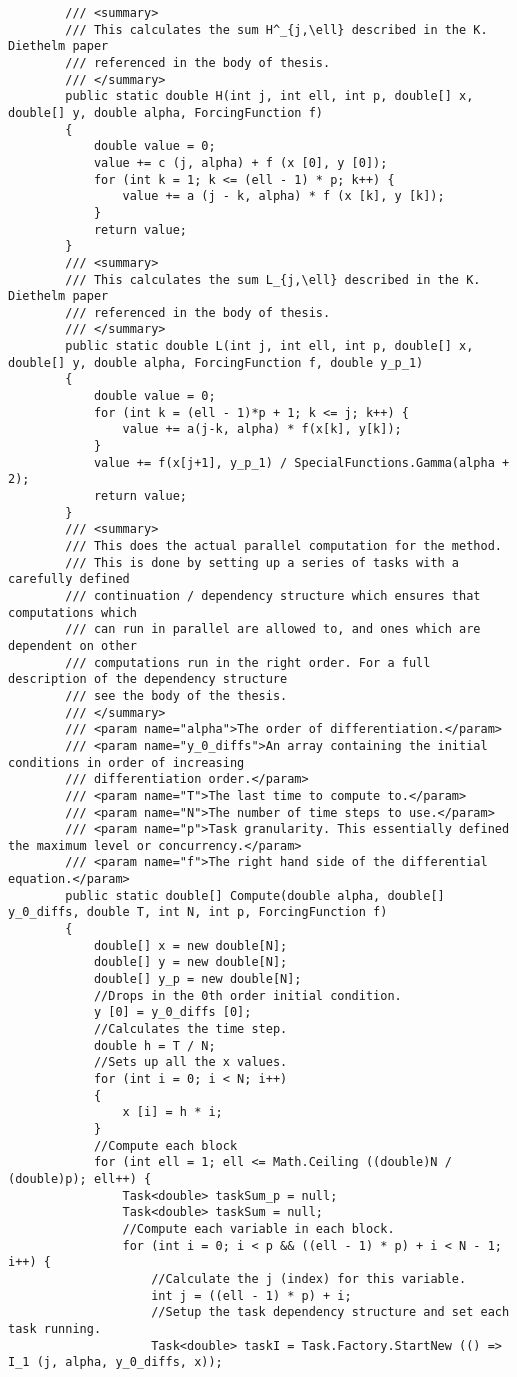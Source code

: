 \begin{lstlisting}
		/// <summary>
		/// This calculates the sum H^_{j,\ell} described in the K. Diethelm paper
		/// referenced in the body of thesis.
		/// </summary>
		public static double H(int j, int ell, int p, double[] x, double[] y, double alpha, ForcingFunction f)
		{
			double value = 0;
			value += c (j, alpha) + f (x [0], y [0]);
			for (int k = 1; k <= (ell - 1) * p; k++) {
				value += a (j - k, alpha) * f (x [k], y [k]);
			}
			return value;
		}
		/// <summary>
		/// This calculates the sum L_{j,\ell} described in the K. Diethelm paper
		/// referenced in the body of thesis.
		/// </summary>
		public static double L(int j, int ell, int p, double[] x, double[] y, double alpha, ForcingFunction f, double y_p_1)
		{
			double value = 0;
			for (int k = (ell - 1)*p + 1; k <= j; k++) {
				value += a(j-k, alpha) * f(x[k], y[k]);
			}
			value += f(x[j+1], y_p_1) / SpecialFunctions.Gamma(alpha + 2);
			return value;
		}
		/// <summary>
		/// This does the actual parallel computation for the method.
		/// This is done by setting up a series of tasks with a carefully defined
		/// continuation / dependency structure which ensures that computations which
		/// can run in parallel are allowed to, and ones which are dependent on other
		/// computations run in the right order. For a full description of the dependency structure
		/// see the body of the thesis.
		/// </summary>
		/// <param name="alpha">The order of differentiation.</param>
		/// <param name="y_0_diffs">An array containing the initial conditions in order of increasing
		/// differentiation order.</param>
		/// <param name="T">The last time to compute to.</param>
		/// <param name="N">The number of time steps to use.</param>
		/// <param name="p">Task granularity. This essentially defined the maximum level or concurrency.</param>
		/// <param name="f">The right hand side of the differential equation.</param>
		public static double[] Compute(double alpha, double[] y_0_diffs, double T, int N, int p, ForcingFunction f)
		{
			double[] x = new double[N];
			double[] y = new double[N];
			double[] y_p = new double[N];
			//Drops in the 0th order initial condition.
			y [0] = y_0_diffs [0];
			//Calculates the time step.
			double h = T / N;
			//Sets up all the x values.
			for (int i = 0; i < N; i++)
			{
				x [i] = h * i;
			}
			//Compute each block
			for (int ell = 1; ell <= Math.Ceiling ((double)N / (double)p); ell++) {
				Task<double> taskSum_p = null;
				Task<double> taskSum = null;
				//Compute each variable in each block.
				for (int i = 0; i < p && ((ell - 1) * p) + i < N - 1; i++) {
					//Calculate the j (index) for this variable.
					int j = ((ell - 1) * p) + i;
					//Setup the task dependency structure and set each task running.
					Task<double> taskI = Task.Factory.StartNew (() => I_1 (j, alpha, y_0_diffs, x));


\end{lstlisting}
